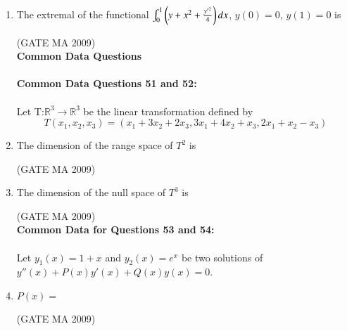 \documentclass[journal,12pt,onecolumn]{IEEEtran}
\theoremstyle{remark}
\begin{document}
\begin{enumerate}[leftmargin=0pt, align=left, start=21]
\item The extremal of the functional $\int_0^1\left(y+x^2+\frac{y'^2}{4}\right)dx$, $y(0)=0$, $y(1)=0$ is
\begin{enumerate}
\end{enumerate}
\hfill (GATE MA 2009)\\
\textbf{Common Data Questions}\\
\\
\textbf{Common Data Questions 51 and 52:}\\
\\
Let T:$\mathbb{R}^3\rightarrow \mathbb{R}^3$ be the linear transformation defined by $$T(x_1,x_2,x_3)=(x_1+3x_2+2x_3,3x_1+4x_2+x_3,2x_1+x_2-x_3)$$
\item The dimension of the range space of $T^2$ is
\begin{enumerate}
\end{enumerate}
\hfill (GATE MA 2009)

\item The dimension of the null space of $T^3$ is
\begin{enumerate}
\end{enumerate}
\hfill (GATE MA 2009)\\
\textbf{Common Data for Questions 53 and 54:}\\
\\
Let $y_1(x)=1+x$ and $y_2(x)=e^x$ be two solutions of $y''(x)+P(x)y'(x)+Q(x)y(x)=0$.\\
\item  $P(x)=$
\begin{enumerate}
\end{enumerate}
\hfill (GATE MA 2009)


\end{enumerate}
\end{document}
